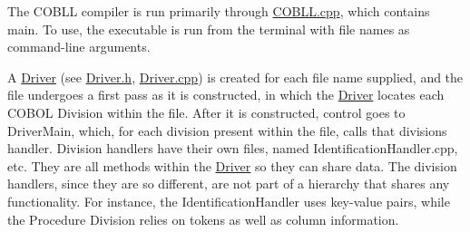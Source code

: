 The COBLL compiler is run primarily through {\ttfamily \mbox{\hyperlink{_c_o_b_l_l_8cpp}{COBLL.\+cpp}}}, which contains {\ttfamily main}. To use, the executable is run from the terminal with file names as command-\/line arguments.

A \mbox{\hyperlink{class_driver}{Driver}} (see {\ttfamily \mbox{\hyperlink{_driver_8h_source}{Driver.\+h}}}, {\ttfamily \mbox{\hyperlink{_driver_8cpp}{Driver.\+cpp}}}) is created for each file name supplied, and the file undergoes a first pass as it is constructed, in which the \mbox{\hyperlink{class_driver}{Driver}} locates each COBOL Division within the file. After it is constructed, control goes to {\ttfamily Driver\+Main}, which, for each division present within the file, calls that division\textquotesingle{}s handler. Division handlers have their own files, named {\ttfamily Identification\+Handler.\+cpp}, etc. They are all methods within the \mbox{\hyperlink{class_driver}{Driver}} so they can share data. The division handlers, since they are so different, are not part of a hierarchy that shares any functionality. For instance, the Identification\+Handler uses key-\/value pairs, while the Procedure Division relies on tokens as well as column information. 